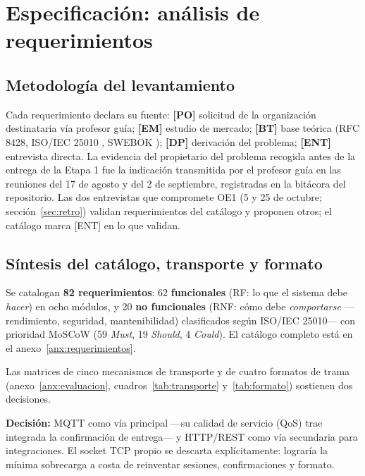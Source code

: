 \chapter[Análisis de requerimientos]{Especificación: análisis de requerimientos}
\label{cap:especificacion}

\section{Metodología del levantamiento}
\label{sec:levantamiento}

Cada requerimiento declara su fuente: \textbf{[PO]} solicitud de la organización destinataria vía
profesor guía; \textbf{[EM]} estudio de mercado; \textbf{[BT]} base teórica (RFC 8428, ISO/IEC 25010
\parencite{iso25010}, SWEBOK \parencite{swebok}); \textbf{[DP]} derivación del problema; \textbf{[ENT]} entrevista
directa. La evidencia del propietario del problema recogida antes de la entrega de la Etapa 1 fue la indicación
transmitida por el profesor guía en las reuniones del 17 de agosto y del 2 de septiembre, registradas en la bitácora del
repositorio. Las dos entrevistas que compromete OE1 (5 y 25 de octubre; sección~\ref{sec:retro}) validan requerimientos del catálogo y proponen otros; el catálogo marca [ENT] en lo que validan.

\section{Síntesis del catálogo, transporte y formato}

Se catalogan \textbf{82 requerimientos}: 62 \textbf{funcionales} (RF: lo que el sistema debe
\emph{hacer}) en ocho módulos, y 20 \textbf{no funcionales} (RNF: cómo debe \emph{comportarse} —
rendimiento, seguridad, mantenibilidad) clasificados según
ISO/IEC 25010— con prioridad MoSCoW (59 \emph{Must}, 19 \emph{Should}, 4 \emph{Could}). El catálogo
completo está en el anexo~\ref{anx:requerimientos}.


Las matrices de cinco mecanismos de transporte y de cuatro formatos de trama (anexo~\ref{anx:evaluacion}, cuadros~\ref{tab:transporte} y~\ref{tab:formato}) sostienen dos decisiones.

\textbf{Decisión:} MQTT como vía principal —su calidad de servicio (QoS) trae integrada la confirmación de entrega— y HTTP/REST como vía secundaria para integraciones. El socket TCP propio se descarta explícitamente:
lograría la mínima sobrecarga a costa de reinventar sesiones, confirmaciones y formato.


